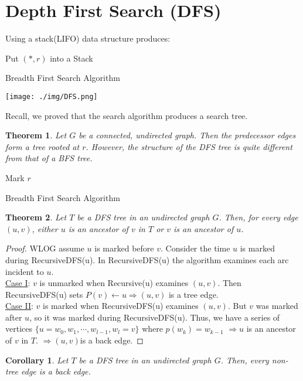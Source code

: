 \documentclass[11pt, a4paper, oneside]{book}
\theoremstyle{theoremdd}
\newtheorem{theorem}{Theorem}[chapter]
\newtheorem{corollary}{Corollary}
\theoremstyle{remark}
\begin{document}
\section*{Depth First Search (DFS)}
Using a stack(LIFO) data structure produces: 
\begin{algorithm}
\SetAlgoLined
{}
Put $(*,r)$ into a Stack\;
\caption{Breadth First Search Algorithm}
\end{algorithm}
\begin{center}
\texttt{[image: ./img/DFS.png]}
\end{center}
Recall, we proved that the search algorithm produces a search tree. 
\begin{theorem}
Let $G$ be a connected, undirected graph. Then the predecessor edges form a tree rooted at $r$. However, the structure of the DFS tree is quite different from that of a BFS tree.
\end{theorem}

\begin{algorithm}
\SetAlgoLined
{}
Mark $r$\;
\caption{Breadth First Search Algorithm}
\end{algorithm}

\begin{theorem}
Let $T$ be a DFS tree in an undirected graph $G$. Then, for every edge $(u,v)$, either $u$ is an ancestor of $v$ in $T$ or $v$ is an ancestor of $u$. 
\end{theorem}
\begin{proof}
WLOG assume $u$ is marked before $v$. Consider the time $u$ is marked during RecursiveDFS(u). In RecursiveDFS(u) the algorithm examines each arc incident to $u$. \\
\underline{Case I}: $v$ is unmarked when Recursive(u) examines $(u,v)$. Then RecursiveDFS(u) sets $P(v)\leftarrow u \Rightarrow (u,v)$ is a tree edge. \\
\underline{Case II}: $v$ is marked when RecursiveDFS(u) examines $(u,v)$. But $v$ was marked after $u$, so it was marked during RecursiveDFS(u). Thus, we have a series of vertices $\{u=w_{0},w_{1},\cdots,w_{l-1},w_{l}=v\}$ where $p(w_{k})=w_{k-1}$ $\Rightarrow u$ is an ancestor of $v$ in $T$. $\Rightarrow (u,v)$is a back edge.
\end{proof}
\begin{corollary}
Let $T$ be a DFS tree in an undirected graph $G$. Then, every non-tree edge is a back edge. 
\end{corollary}
\end{document}
